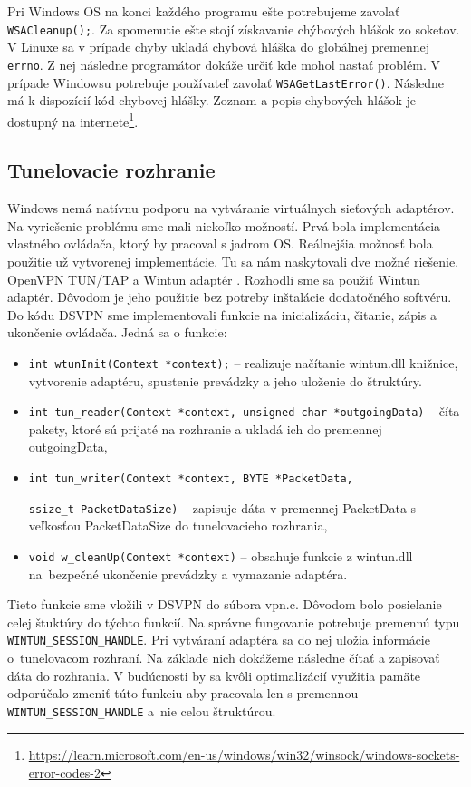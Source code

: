 Pri Windows OS na konci každého programu ešte potrebujeme zavolať \\\lstinline|WSACleanup();|. Za spomenutie ešte stojí získavanie chýbových hlášok zo soketov. V Linuxe sa v prípade chyby ukladá chybová hláška do globálnej premennej  \lstinline|errno|. Z nej následne programátor dokáže určiť kde mohol nastať problém. V prípade Windowsu potrebuje používateľ zavolať \lstinline|WSAGetLastError()|. Následne má k dispozícií kód chybovej hlášky. Zoznam a popis chybových hlášok je dostupný na internete\footnote{\url{https://learn.microsoft.com/en-us/windows/win32/winsock/windows-sockets-error-codes-2}}.  
\subsection{Tunelovacie rozhranie}
Windows nemá natívnu podporu na vytváranie virtuálnych sieťových adaptérov. Na vyriešenie problému sme mali niekoľko možností. Prvá bola implementácia vlastného ovládača, ktorý by pracoval s jadrom OS. Reálnejšia možnosť bola použitie už vytvorenej implementácie. Tu sa nám naskytovali dve možné riešenie. OpenVPN TUN/TAP a Wintun adaptér \cite{wintun}. Rozhodli sme sa použiť Wintun adaptér. Dôvodom je jeho použitie bez potreby inštalácie dodatočného softvéru. 
Do kódu DSVPN sme implementovali funkcie na inicializáciu, čitanie, zápis a ukončenie ovládača. Jedná sa o funkcie: 
\begin{itemize}
	\item\lstinline|int wtunInit(Context *context);| -- realizuje načítanie wintun.dll knižnice, vytvorenie adaptéru, spustenie prevádzky a jeho uloženie do štruktúry.
	\item\lstinline|int tun_reader(Context *context, unsigned char *outgoingData)| -- číta pakety, ktoré sú prijaté na rozhranie a ukladá ich do premennej outgoingData,
	\item\lstinline|int tun_writer(Context *context, BYTE *PacketData,| 
	
		\lstinline|ssize_t PacketDataSize)| -- zapisuje dáta v premennej PacketData s veľkosťou PacketDataSize do tunelovacieho rozhrania,
	\item\lstinline|void w_cleanUp(Context *context)| -- obsahuje funkcie z wintun.dll na~bezpečné ukončenie prevádzky a vymazanie adaptéra.
\end{itemize} 

Tieto funkcie sme vložili v DSVPN do súbora vpn.c. Dôvodom bolo posielanie celej štuktúry do týchto funkcií. Na správne fungovanie potrebuje premennú typu \lstinline|WINTUN_SESSION_HANDLE|. Pri vytváraní adaptéra sa do nej uložia informácie o~tunelovacom rozhraní. Na základe nich dokážeme následne čítať a zapisovať dáta do rozhrania. V budúcnosti by sa kvôli optimalizácií využitia pamäte odporúčalo zmeniť túto funkciu aby pracovala len s premennou \lstinline|WINTUN_SESSION_HANDLE| a~nie celou štruktúrou.

